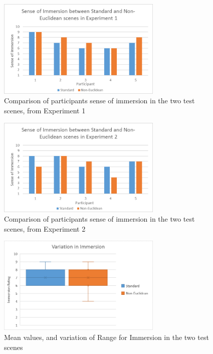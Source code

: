 			\begin{figure}
				\label{exp:fig:compare_immersion_exp1}
				\includegraphics[width=0.7\textwidth]{Images/Compare_Immersion_Exp_1}
				\centering
				\caption{Comparison of participants sense of immersion in the two test scenes, from Experiment 1}
			\end{figure}

			\begin{figure}
				\label{exp:fig:compare_immersion_exp2}
				\includegraphics[width=0.7\textwidth]{Images/Compare_Immersion_Exp_2}
				\centering
				\caption{Comparison of participants sense of immersion in the two test scenes, from Experiment 2}
			\end{figure}

			\begin{figure}
				\label{exp:fig:compare_immersion_variation}
				\includegraphics[width=0.7\textwidth]{Images/Compare_Immersion_Variation}
				\centering
				\caption{Mean values, and variation of Range for Immersion in the two test scenes}
			\end{figure}

